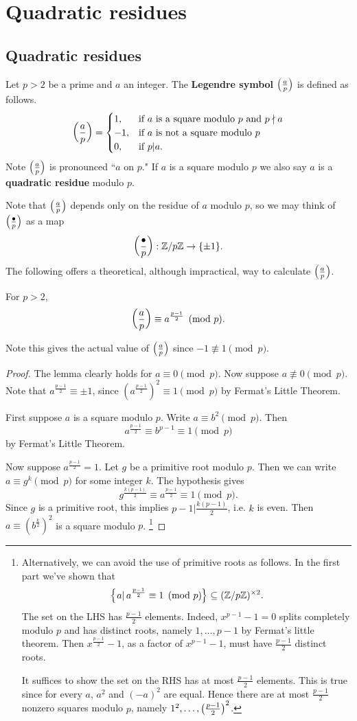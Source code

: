 \chapter{Quadratic residues}
\section{Quadratic residues}
\begin{df}
Let $p>2$ be a prime and $a$ an integer. The \textbf{Legendre symbol} $\left( {\frac{a}{p}} \right)$ is defined as follows.
\begin{equation}
\left( {\frac{a}{p}} \right)=
\begin{cases}
1,&\text{if $a$ is a square modulo $p$ and $p\nmid a$}\\
-1,&\text{if $a$ is not a square modulo $p$}\\
0,&\text{if $p|a$.}
\end{cases}
\end{equation}
Note $\left( {\frac{a}{p}} \right)$ is pronounced ``$a$ on $p$." If $a$ is a square modulo $p$ we also say $a$ is a \textbf{quadratic residue} modulo $p$.
\end{df}
Note that $\left( {\frac{a}{p}} \right)$ depends only on the residue of $a$ modulo $p$, so we may think of $\left( {\frac{\bullet}{p}} \right)$ as a map
\[
\left( {\frac{\bullet}{p}} \right):\mathbb{Z}/p\mathbb{Z}\to \{\pm 1\}.
\]
The following offers a theoretical, although impractical, way to calculate $\left( {\frac{a}{p}} \right)$.
\begin{lem}\label{legpower}
For $p>2$,
\[
\left( {\frac{a}{p}} \right)\equiv a^{\frac{p-1}{2}}\pmod{p}.
\]
\end{lem}
Note this gives the actual value of $\left( {\frac{a}{p}} \right)$ since $-1\nequiv 1\pmod{p}$.
\begin{proof}
The lemma clearly holds for $a\equiv 0\pmod{p}$. Now suppose $a\nequiv 0\pmod{p}$. Note that $a^{\frac{p-1}{2}}\equiv \pm 1$, since $(a^{\frac{p-1}{2}})^2\equiv 1\pmod p$ by Fermat's Little Theorem.

First suppose $a$ is a square modulo $p$. Write $a\equiv b^2\pmod{p}$. Then
\[
a^{\frac{p-1}2}\equiv b^{p-1}\equiv 1\pmod{p}
\]
by Fermat's Little Theorem.

Now suppose $a^{\frac{p-1}{2}}=1$. Let $g$ be a primitive root modulo $p$. Then we can write $a\equiv g^k\pmod{p}$ for some integer $k$. The hypothesis gives
\[
g^{\frac{k(p-1)}2}\equiv a^{\frac{p-1}{2}}\equiv 1\pmod{p}.
\]
Since $g$ is a primitive root, this implies $p-1|\frac{k(p-1)}{2}$, i.e. $k$ is even. Then $a\equiv (b^{\frac k2})^2$ is a square modulo $p$.
\footnote{
Alternatively, we can avoid the use of primitive roots as follows. In the first part we've shown that
\[
\left\{\left.{a}\right|{a^{\frac{p-1}{2}}\equiv 1\pmod{p}}\right\}\subseteq (\mathbb{Z}/p\mathbb{Z})^{\times 2}.
\]
The set on the LHS has $\frac{p-1}{2}$ elements. Indeed,  $x^{p-1}-1=0$ splits completely modulo $p$ and has distinct roots, namely $1, \ldots, p-1$ by Fermat's little theorem. Then $x^{\frac{p-1}{2}}-1$, as a factor of $x^{p-1}-1$, must have $\frac{p-1}{2}$ distinct roots.

It suffices to show the set on the RHS has at most $\frac{p-1}2$ elements. This is true since for every $a$, $a^2$ and $(-a)^2$ are equal. Hence there are at most $\frac{p-1}{2}$ nonzero squares modulo $p$, namely $1^2, \ldots, \left( {\frac{p-1}{2}} \right)^2$.
}
\end{proof}
